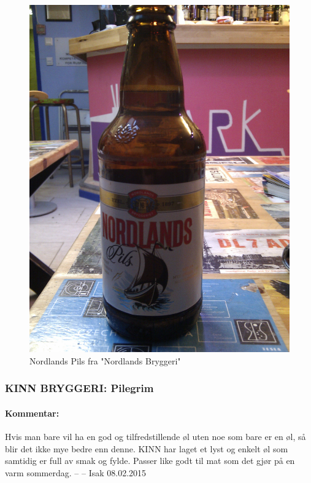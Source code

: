 \documentclass[12pt,a4paper,oneside,norsk]{article}
\begin{document}
\begin{figure} [H]
\centering
\includegraphics[scale=0.1, angle=0]{Bilder/Ol/NordlandsPils.jpg}
\caption{Nordlands Pils fra "Nordlands Bryggeri"}
\end{figure}

\newpage
\subsubsection{KINN BRYGGERI: Pilegrim}
\paragraph{Kommentar:} Hvis man bare vil ha en god og tilfredstillende øl uten noe som bare er en øl, så blir det ikke mye bedre enn denne. KINN har laget et lyst og enkelt øl som samtidig er full av smak og fylde. Passer like godt til mat som det gjør på en varm sommerdag. 
\newline
-- -- Isak 08.02.2015
\end{document}
